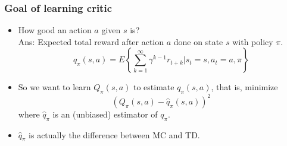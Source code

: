 \begin{frame}
  \frametitle{Goal of learning critic}
  \begin{itemize}
  \item How good an action $a$ given $s$ is? \\
    Ans: Expected total reward after action $a$ done on state $s$ with policy $\pi$.
    \begin{equation*}
      q_\pi(s, a) = E \left\{\sum_{k=1}^\infty \gamma^{k-1} r_{t+k} | s_t = s, a_t = a, \pi \right\}
    \end{equation*}
  \item So we want to learn $Q_\pi(s, a)$ to estimate $q_\pi(s, a)$, that is, minimize
    \begin{equation*}
      (Q_\pi(s, a) - \hat{q}_\pi(s, a))^2
    \end{equation*}
    where $\hat{q}_\pi$ is an (unbiased) estimator of $q_\pi$.
  \item $\hat{q}_\pi$ is actually the difference between MC and TD.
  \end{itemize}
\end{frame}